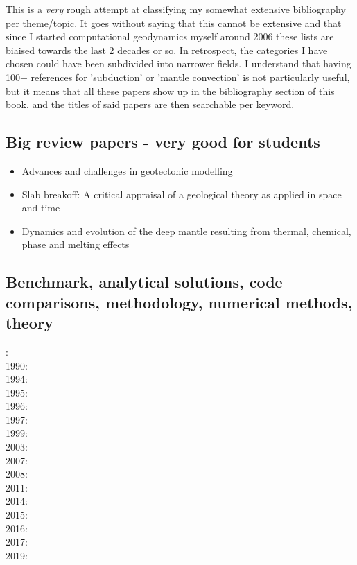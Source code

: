This is a {\it very} rough attempt at classifying my somewhat extensive 
bibliography per theme/topic.
It goes without saying that this cannot be extensive and that since I 
started computational geodynamics myself around 2006 these lists are 
biaised towards the last 2 decades or so. 
In retrospect, the categories I have chosen could have been subdivided
into narrower fields. I understand that having 100+ references 
for 'subduction'  or 'mantle convection' is not particularly useful, 
but it means that all these papers show up in the bibliography section 
of this book, and the titles of said papers are then searchable per keyword.

\subsection*{Big review papers - very good for students}

\begin{itemize}
\item Advances and challenges in geotectonic modelling \cite{bufy14}
\item Slab breakoff: A critical appraisal of a geological theory as applied in space and time \cite{garm18}
\item Dynamics and evolution of the deep mantle resulting from thermal, chemical, phase
and melting effects \cite{tack12}
\end{itemize}


\subsection*{Benchmark, analytical solutions, code comparisons, methodology, numerical methods, theory}

: \cite{yusa84}\\
1990: \cite{trab90}\\
1994: \cite{brsa94}\\
1995: \cite{brsa95}\\
1996: \cite{zhon96}\\
1997: \cite{rist97}\\
1999: \cite{lind99}\\
2003: \cite{taki03}\\
2007: \cite{toma07}\\
2008: \cite{zhmt08}\cite{deka08}\cite{trub08}\\
2011: \cite{dumg11}\cite{uibb11}\\
2014: \cite{thmk14}\\
2015: \cite{lelk15}\cite{rumi15}\\
2016: \cite{dumy16}\\
2017: \cite{robh17}\cite{wisv17}\\
2019: \cite{clhe19}

